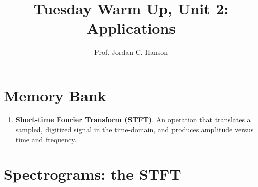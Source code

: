 \documentclass{article}
\begin{document}
\twocolumn

\title{Tuesday Warm Up, Unit 2: Applications}
\author{Prof. Jordan C. Hanson}
\maketitle

\section{Memory Bank}

\begin{enumerate}
\item \textbf{Short-time Fourier Transform (STFT)}.  An operation that translates a sampled, digitized signal in the time-domain, and produces amplitude versus time and frequency.
\end{enumerate}

\section{Spectrograms: the STFT}
\end{document}
